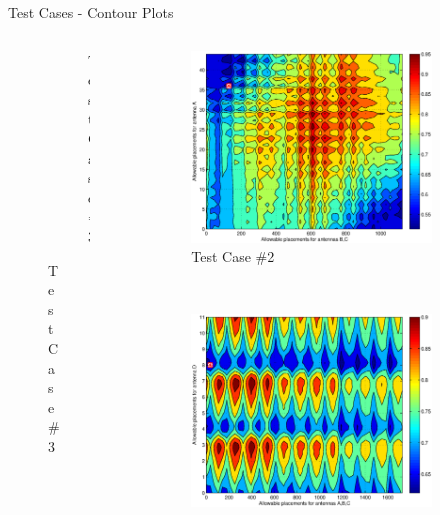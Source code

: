 \documentclass{beamer}
\begin{document}
\begin{frame}{Test Cases - Contour Plots}
\begin{columns}
\begin{column}{.5\columnwidth}
\begin{figure}
\begin{subfigure}{\columnwidth}
                    \vspace*{-0.2cm}
                    \caption*{\tiny Test Case \#3}%
                \end{subfigure}\hfill%
            \end{figure}
        \end{column}
        \begin{column}{.5\columnwidth}
    \begin{figure}
                    \vspace*{-.8cm}
                \begin{subfigure}{\columnwidth}
                    \centering
                    \includegraphics[trim=5 0 10 0, clip,scale=0.23]{../paper/FIG/tc2_contour}%
                \vspace*{-0.2cm}
                    \caption*{\tiny Test Case \#2}
                \end{subfigure}\hfill\\
                \begin{subfigure}{\columnwidth}
                    \centering
                    \includegraphics[trim=5 0 10 0, clip,scale=0.23]{../paper/FIG/tc4_contour}%

\end{subfigure}
\end{figure}
\end{column}
\end{columns}
\end{frame}
\end{document}

